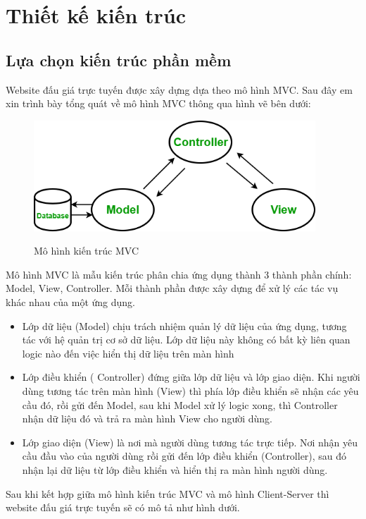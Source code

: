 \documentclass[../DoAn.tex]{subfiles}
\begin{document}
\section{Thiết kế kiến trúc}
\subsection{Lựa chọn kiến trúc phần mềm}
Website đấu giá trực tuyến được xây dựng dựa theo mô hình MVC. Sau đây em xin trình bày tổng quát về mô hình MVC thông qua hình vẽ bên dưới: 
\begin{figure}[H]
    \centering
    \includegraphics[width=10.6cm,height=4.15cm]{Hinhve/mvc.png}\cite{MVC}
    \caption{Mô hình kiến trúc MVC}
    \label{fig:Fig41}
\end{figure}
Mô hình MVC là mẫu kiến trúc phân chia ứng dụng thành 3 thành phần chính: Model, View, Controller. Mỗi thành phần được xây dựng để xử lý các tác vụ khác nhau của một ứng dụng.
\begin{itemize}
    \item Lớp dữ liệu (Model) chịu trách nhiệm quản lý dữ liệu của ứng dụng, tương tác với hệ quản trị cơ sở dữ liệu. Lớp dữ liệu này không có bất kỳ liên quan logic nào đến việc hiển thị dữ liệu trên màn hình
    \item Lớp điều khiển ( Controller) đứng giữa lớp dữ liệu và lớp giao diện. Khi người dùng tương tác trên màn hình (View) thì phía lớp điều khiển sẽ nhận các yêu cầu đó, rồi gửi đến Model, sau khi Model xử lý logic xong, thì Controller nhận dữ liệu đó và trả ra màn hình View cho người dùng.
    \item Lớp giao diện (View) là nơi mà người dùng tương tác trực tiếp. Nơi nhận yêu cầu đầu vào của người dùng rồi gửi đến lớp điều khiển (Controller), sau đó nhận lại dữ liệu từ lớp điều khiển và hiển thị ra màn hình người dùng.
\end{itemize}
Sau khi kết hợp giữa mô hình kiến trúc MVC và mô hình Client-Server thì website đấu giá trực tuyến sẽ có mô tả như hình dưới. 
\end{document}
